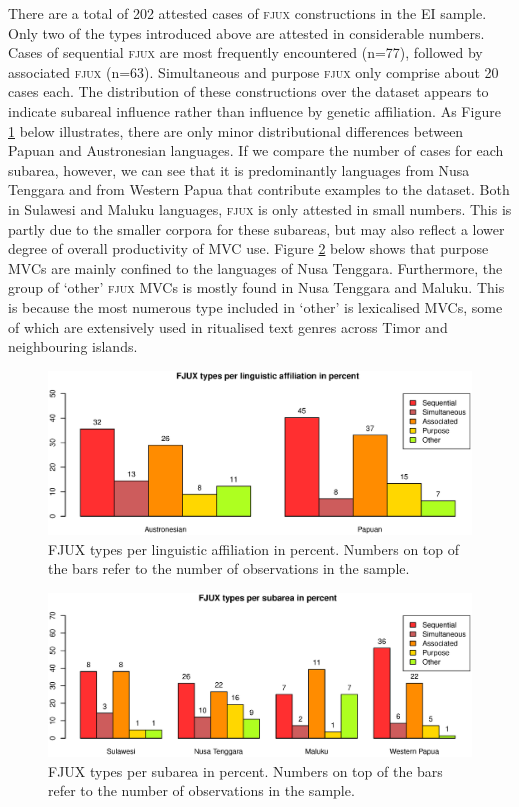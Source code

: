 There are a total of 202 attested cases of \textsc{fjux} constructions in the EI sample. Only two of the types introduced above are attested in considerable numbers. Cases of sequential \textsc{fjux} are most frequently encountered (n=77), followed by associated \textsc{fjux} (n=63). Simultaneous and purpose \textsc{fjux} only comprise about 20 cases each. The distribution of these constructions over the dataset appears to indicate subareal influence rather than influence by genetic affiliation. As Figure \ref{fig:fjux-family} below illustrates, there are only minor distributional differences between Papuan and Austronesian languages. If we compare the number of cases for each subarea, however, we can see that it is predominantly languages from Nusa Tenggara and from Western Papua that contribute examples to the dataset. Both in Sulawesi and Maluku languages, \textsc{fjux} is only attested in small numbers. This is partly due to the smaller corpora for these subareas, but may also reflect a lower degree of overall productivity of MVC use. Figure \ref{fig:fjux-group} below shows that purpose MVCs are mainly confined to the languages of Nusa Tenggara. Furthermore, the group of `other' \textsc{fjux} MVCs is mostly found in Nusa Tenggara and Maluku. This is because the most numerous type included in `other' is lexicalised MVCs, some of which are extensively used in ritualised text genres across Timor and neighbouring islands.

\begin{figure}
\includegraphics[width=\columnwidth]{figures/FJUX_family.eps}
\caption[FJUX types per linguistic affiliation in percent]{FJUX types per linguistic affiliation in percent. Numbers on top of the bars refer to the number of observations in the sample.}\label{fig:fjux-family}
\end{figure}
\begin{figure}
\includegraphics[width=\columnwidth]{figures/FJUX_group.eps}
\caption[FJUX types per subarea in percent]{FJUX types per subarea in percent. Numbers on top of the bars refer to the number of observations in the sample.}\label{fig:fjux-group}
\end{figure}

